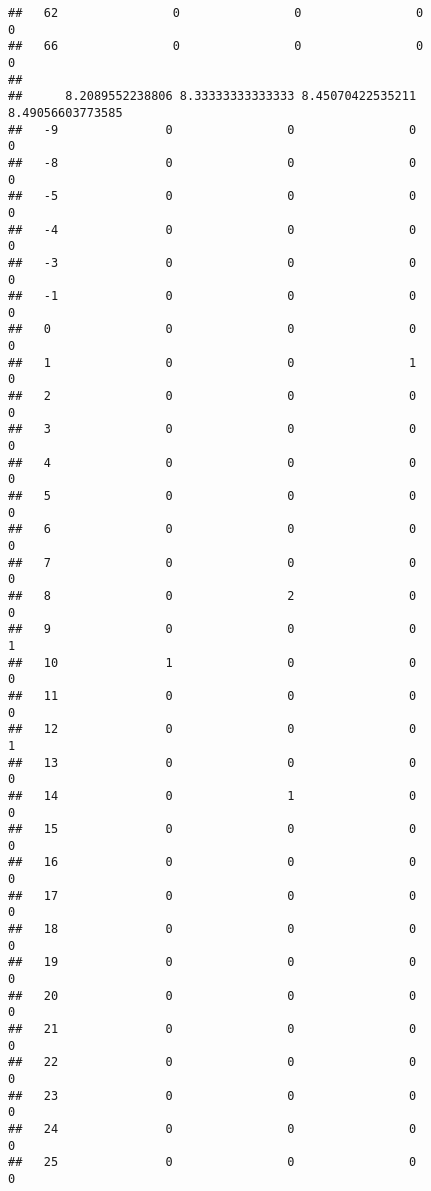 \documentclass[]{article}
\begin{document}
\begin{verbatim}
##   62                0                0                0                0
##   66                0                0                0                0
##     
##      8.2089552238806 8.33333333333333 8.45070422535211 8.49056603773585
##   -9               0                0                0                0
##   -8               0                0                0                0
##   -5               0                0                0                0
##   -4               0                0                0                0
##   -3               0                0                0                0
##   -1               0                0                0                0
##   0                0                0                0                0
##   1                0                0                1                0
##   2                0                0                0                0
##   3                0                0                0                0
##   4                0                0                0                0
##   5                0                0                0                0
##   6                0                0                0                0
##   7                0                0                0                0
##   8                0                2                0                0
##   9                0                0                0                1
##   10               1                0                0                0
##   11               0                0                0                0
##   12               0                0                0                1
##   13               0                0                0                0
##   14               0                1                0                0
##   15               0                0                0                0
##   16               0                0                0                0
##   17               0                0                0                0
##   18               0                0                0                0
##   19               0                0                0                0
##   20               0                0                0                0
##   21               0                0                0                0
##   22               0                0                0                0
##   23               0                0                0                0
##   24               0                0                0                0
##   25               0                0                0                0

\end{verbatim}
\end{document}

